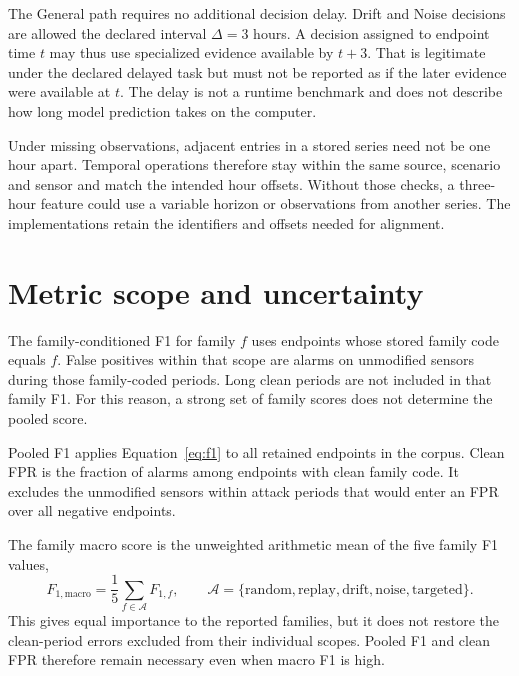 The General path requires no additional decision delay. Drift and Noise decisions are allowed the declared interval $\Delta=3$ hours. A decision assigned to endpoint time $t$ may thus use specialized evidence available by $t+3$. That is legitimate under the declared delayed task but must not be reported as if the later evidence were available at $t$. The delay is not a runtime benchmark and does not describe how long model prediction takes on the computer.

Under missing observations, adjacent entries in a stored series need not be one hour apart. Temporal operations therefore stay within the same source, scenario and sensor and match the intended hour offsets. Without those checks, a three-hour feature could use a variable horizon or observations from another series. The implementations retain the identifiers and offsets needed for alignment.


\section{Metric scope and uncertainty}
The family-conditioned F1 for family $f$ uses endpoints whose stored family code equals $f$. False positives within that scope are alarms on unmodified sensors during those family-coded periods. Long clean periods are not included in that family F1. For this reason, a strong set of family scores does not determine the pooled score.

Pooled F1 applies Equation~\eqref{eq:f1} to all retained endpoints in the corpus. Clean FPR is the fraction of alarms among endpoints with clean family code. It excludes the unmodified sensors within attack periods that would enter an FPR over all negative endpoints.

The family macro score is the unweighted arithmetic mean of the five family F1 values,
\begin{equation}
 F_{1,\mathrm{macro}}=\frac{1}{5}\sum_{f\in\mathcal A}F_{1,f},
 \qquad \mathcal A=\{\mathrm{random,replay,drift,noise,targeted}\}.
\end{equation}
This gives equal importance to the reported families, but it does not restore the clean-period errors excluded from their individual scopes. Pooled F1 and clean FPR therefore remain necessary even when macro F1 is high.

